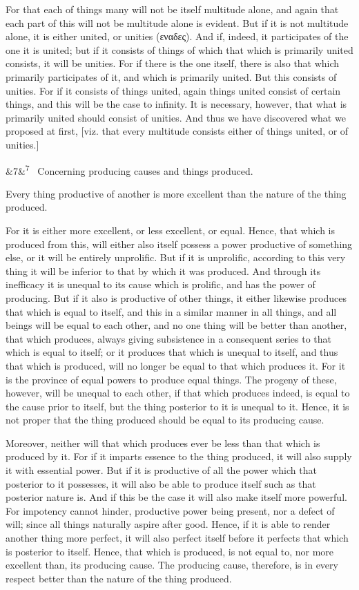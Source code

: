 \documentclass[12pt]{article}
\newcommand{\para}[1][]{\par\noindent\ifx&#1&\else\textsuperscript{\footnotesize #1}~\fi}
\begin{document}
For that each of things many will not be itself multitude alone, and again that each part of this will not be multitude alone is evident. But if it is not multitude alone, it is either united, or unities (εναδες). And if, indeed, it participates of the one it is united; but if it consists of things of which that which is primarily united consists, it will be unities. For if there is the one itself, there is also that which primarily participates of it, and which is primarily united. But this consists of unities. For if it consists of things united, again things united consist of certain things, and this will be the case to infinity. It is necessary, however, that what is primarily united should consist of unities. And thus we have discovered what we proposed at first, [viz. that every multitude consists either of things united, or of unities.]

\para[7] Concerning producing causes and things produced.

Every thing productive of another is more excellent than the nature of the thing produced.

For it is either more excellent, or less excellent, or equal. Hence, that which is produced from this, will either also itself possess a power productive of something else, or it will be entirely unprolific. But if it is unprolific, according to this very thing it will be inferior to that by which it was produced. And through its inefficacy it is unequal to its cause which is prolific, and has the power of producing. But if it also is productive of other things, it either likewise produces that which is equal to itself, and this in a similar manner in all things, and all beings will be equal to each other, and no one thing will be better than another, that which produces, always giving subsistence in a consequent series to that which is equal to itself; or it produces that which is unequal to itself, and thus that which is produced, will no longer be equal to that which produces it. For it is the province of equal powers to produce equal things. The progeny of these, however, will be unequal to each other, if that which produces indeed, is equal to the cause prior to itself, but the thing posterior to it is unequal to it. Hence, it is not proper that the thing produced should be equal to its producing cause.

Moreover, neither will that which produces ever be less than that which is produced by it. For if it imparts essence to the thing produced, it will also supply it with essential power. But if it is productive of all the power which that posterior to it possesses, it will also be able to produce itself such as that posterior nature is. And if this be the case it will also make itself more powerful. For impotency cannot hinder, productive power being present, nor a defect of will; since all things naturally aspire after good. Hence, if it is able to render another thing more perfect, it will also perfect itself before it perfects that which is posterior to itself. Hence, that which is produced, is not equal to, nor more excellent than, its producing cause. The producing cause, therefore, is in every respect better than the nature of the thing produced.
\end{document}
